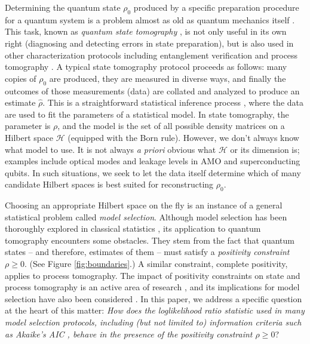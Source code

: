 \documentclass[aps,pra, twocolumn]{revtex4-1}
\newcommand{\cH}{\mathcal{H}}
\newcommand{\rhohat}{\hat{\rho}}
\begin{document}
Determining the quantum state $\rho_{0}$ produced by a specific preparation procedure for a quantum system is a problem almost as old as quantum mechanics itself \cite{Corbett2006, Pauli1933}. This task, known as \emph{quantum state tomography} \cite{Paris2004}, is not only useful in its own right (diagnosing and detecting errors in state preparation), but is also used in other characterization protocols including entanglement verification \cite{Steffen2006, Blume-Kohout2010c, VanEnk2007} and process tomography \cite{Anis2012}. A typical state tomography protocol proceeds as follows: many copies of $\rho_{0}$ are produced, they are measured in diverse ways, and finally the outcomes of those measurements (data) are collated and analyzed to produce an estimate $\rhohat$.  This is a straightforward statistical inference process \cite{Reid2015, Wasserman2004}, where the data are used to fit the parameters of a statistical model. In state tomography, the parameter is $\rho$, and the model is the set of all possible density matrices on a Hilbert space $\cH$ (equipped with the Born rule). However, we don't always know what model to use. It is not always \emph{a priori} obvious what $\cH$ or its dimension is; examples include optical modes \cite{Altepeter2005, Bertrand1987, Lvovsky2009, Breitenbach1997, Leonhardt1995} and leakage levels in AMO and superconducting \cite{Motzoi2009, Fazio1999} qubits. In such situations, we seek to let the data itself determine which of many candidate Hilbert spaces is best suited for reconstructing $\rho_{0}$.

Choosing an appropriate Hilbert space on the fly is an instance of a general statistical problem called \emph{model selection}.  Although model selection has been thoroughly explored in classical statistics \cite{Burnham2004}, its application to quantum tomography encounters some obstacles.  They stem from the fact that quantum states -- and therefore, estimates of them -- must satisfy a \emph{positivity constraint} $\rho\geq0$.  (See Figure \ref{fig:boundaries}.) A similar constraint, complete positivity, applies to process tomography.  The impact of positivity constraints on state and process tomography is an active area of research \cite{Candes2006, Flammia2012a, Suess2016, Carpentier2015}, and its implications for model selection have also been considered \cite{Schwarz2013a, Guta2012a, VanEnk2013a, Langford2013, Yin2011, Moroder2013, Knips2015}.  In this paper, we address a specific question at the heart of this matter:  \emph{How does the loglikelihood ratio statistic used in many model selection protocols, including (but not limited to) information criteria such as Akaike's AIC \cite{Akaike1974}, behave in the presence of the positivity constraint $\rho\geq0$}? 
\end{document}
